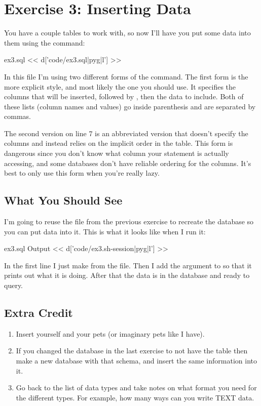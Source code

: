 \chapter{Exercise 3: Inserting Data}

You have a couple tables to work with, so now I'll have you put some data into them
using the  command:

\begin{code}{ex3.sql}
<< d['code/ex3.sql|pyg|l'] >>
\end{code}

In this file I'm using two different forms of the  command.
The first form is the more explicit style, and most likely the one you should
use.  It specifies the columns that will be inserted, followed by ,
then the data to include.  Both of these lists (column names and values)
go inside parenthesis and are separated by commas.

The second version on line 7 is an abbreviated version that doesn't specify
the columns and instead relies on the implicit order in the table.  This form
is dangerous since you don't know what column your statement is actually 
accessing, and some databases don't have reliable ordering for the columns.
It's best to only use this form when you're really lazy.

\section{What You Should See}

I'm going to reuse the  file from the previous exercise to
recreate the database so you can put data into it.  This is what it looks
like when I run it:

\begin{code}{ex3.sql Output}
<< d['code/ex3.sh-session|pyg|l'] >>
\end{code}

In the first line I just make  from the  file.
Then I add the  argument to  so that it
prints out what it is doing.  After that the data is in the database
and ready to query.

\section{Extra Credit}

\begin{enumerate}
\item Insert yourself and your pets (or imaginary pets like I have).
\item If you changed the database in the last exercise to not have the 
     table then make a new database with that schema,
    and insert the same information into it.
\item Go back to the list of data types and take notes on what format
    you need for the different types. For example, how many ways can you
    write TEXT data.
\end{enumerate}

